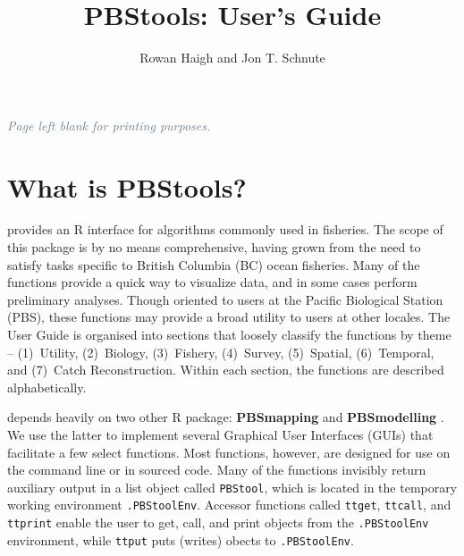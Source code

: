 \documentclass[letterpaper,12pt,fleqn]{article}
\def\tab{\hspace{0.5 in}}
\newcommand{\code}[1]{\small\texttt{#1}\normalsize}
\newcommand{\pkg}[1]{{\bf #1}}
\newcommand{\grey}[1]{{\textcolor{slategrey} {#1}}}
\begin{document}

\title{PBStools: User's Guide}
\author{Rowan Haigh and Jon T. Schnute}

\maketitle
\tableofcontents
\listoftables %
\listoffigures %

\clearpage
\begin{minipage}{\textwidth}
\vspace*{4in}
\begin{center}
\LARGE\it\grey{Page left blank for printing purposes.}
\end{center}
\vfill %
\end{minipage}

\newpage
{}

{} %
\section* {What is PBStools?}

\tab \pkg{PBStools} provides an R interface for algorithms commonly used in fisheries. The scope of this package is by no means comprehensive, having grown from the need to satisfy tasks specific to British Columbia (BC) ocean fisheries. Many of the functions provide a quick way to visualize data, and in some cases perform preliminary analyses. Though oriented to users at the Pacific Biological Station (PBS), these functions may provide a broad utility to users at other locales. The User Guide is organised into sections that loosely classify the functions by theme -- (1)~Utility, (2)~Biology, (3)~Fishery, (4)~Survey, (5)~Spatial, (6)~Temporal, and (7)~Catch Reconstruction. Within each section, the functions are described alphabetically.

\tab \pkg{PBStools} depends heavily on two other R package: \pkg{PBSmapping} \citep{Schnute-etal:2004b,Boers-etal:2004} and \pkg{PBSmodelling} \citep{Schnute-etal:2006}. We use the latter to implement several Graphical User Interfaces (GUIs) that facilitate a few select functions. Most functions, however, are designed for use on the command line or in sourced code. Many of the functions invisibly return auxiliary output in a list object called \code{PBStool}, which is located in the temporary working environment \code{.PBStoolEnv}. Accessor functions called \code{ttget}, \code{ttcall}, and \code{ttprint} enable the user to get, call, and print objects from the \code{.PBStoolEnv} environment, while \code{ttput} puts (writes) obects to \code{.PBStoolEnv}.
\end{document}
